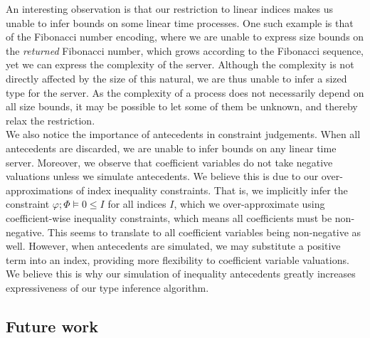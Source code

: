 An interesting observation is that our restriction to linear indices makes us unable to infer bounds on some linear time processes. One such example is that of the Fibonacci number encoding, where we are unable to express size bounds on the \textit{returned} Fibonacci number, which grows according to the Fibonacci sequence, yet we can express the complexity of the server. Although the complexity is not directly affected by the size of this natural, we are thus unable to infer a sized type for the server. As the complexity of a process does not necessarily depend on all size bounds, it may be possible to let some of them be unknown, and thereby relax the restriction.\\

We also notice the importance of antecedents in constraint judgements. When all antecedents are discarded, we are unable to infer bounds on any linear time server. Moreover, we observe that coefficient variables do not take negative valuations unless we simulate antecedents. We believe this is due to our over-approximations of index inequality constraints. That is, we implicitly infer the constraint $\varphi;\Phi\vDash 0 \leq I$ for all indices $I$, which we over-approximate using coefficient-wise inequality constraints, which means all coefficients must be non-negative. This seems to translate to all coefficient variables being non-negative as well. However, when antecedents are simulated, we may substitute a positive term into an index, providing more flexibility to coefficient variable valuations. We believe this is why our simulation of inequality antecedents greatly increases expressiveness of our type inference algorithm.




\subsection{Future work}

